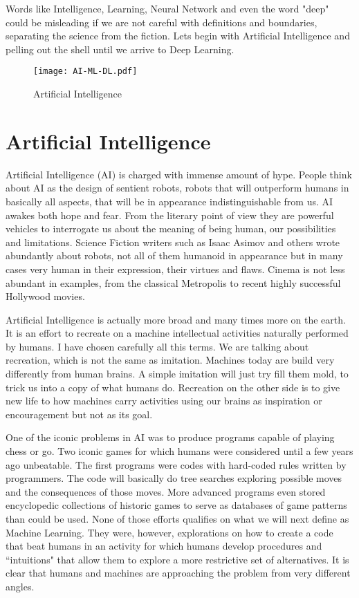 \documentclass[10pt]{book}
\begin{document}
Words like Intelligence, Learning, Neural Network and even the word "deep" could be misleading if we are not careful with definitions and boundaries, separating the science from the fiction.
Lets begin with Artificial Intelligence and pelling out the shell until we arrive to Deep Learning.

\begin{center}
\begin{figure}
\texttt{[image: AI-ML-DL.pdf]}
\caption{Artificial Intelligence}
\label{fig:ai-ml-dl}
\end{figure}
\end{center}

\section{Artificial Intelligence}

Artificial Intelligence (AI) is charged with immense amount of hype.
People think about AI as the design of sentient robots, robots that will outperform humans in basically all aspects, that will be in appearance indistinguishable from us. AI awakes both hope and fear. 
From the literary point of view they are powerful vehicles to interrogate us about the meaning of being human, our possibilities and limitations. 
Science Fiction writers such as Isaac Asimov and others wrote abundantly about robots, not all of them humanoid in appearance but in many cases very human in their expression, their virtues and flaws. 
Cinema is not less abundant in examples, from the classical Metropolis to recent highly successful Hollywood movies.

Artificial Intelligence is actually more broad and many times more on the earth. 
It is an effort to recreate on a machine intellectual activities naturally performed by humans.
I have chosen carefully all this terms. 
We are talking about recreation, which is not the same as imitation.
Machines today are build very differently from human brains.
A simple imitation will just try fill them mold, to trick us into a copy of what humans do. 
Recreation on the other side is to give new life to how machines carry activities using our brains as inspiration or encouragement but not as its goal.

One of the iconic problems in AI was to produce programs capable of playing chess or go. Two iconic games for which humans were considered until a few years ago unbeatable. 
The first programs were codes with hard-coded rules written by programmers. The code will basically do tree searches exploring possible moves and the consequences of those moves. More advanced programs even stored encyclopedic collections of historic games to serve as databases of game patterns than could be used. 
None of those efforts qualifies on what we will next define as Machine Learning. 
They were, however, explorations on how to create a code that beat humans in an activity for which humans develop procedures and ``intuitions" that allow them to explore a more restrictive set of alternatives. It is clear that humans and machines are approaching the problem from very different angles.
\end{document}
